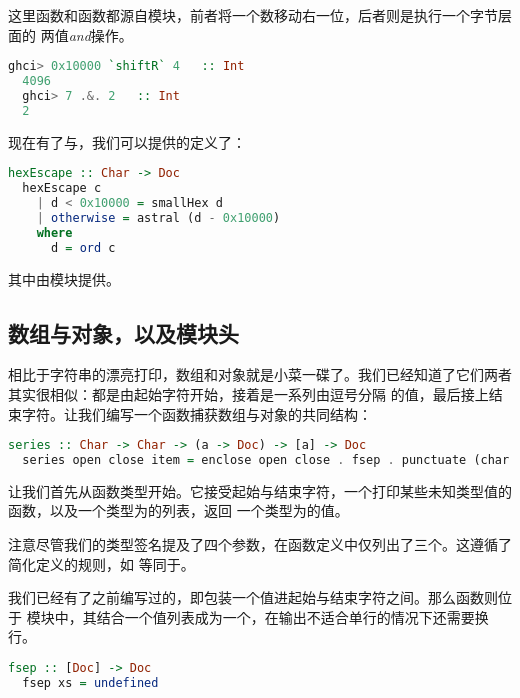 \documentclass[./main.tex]{subfiles}
\begin{document}
这里函数和函数都源自模块，前者将一个数移动右一位，后者则是执行一个字节层面的
两值\textit{and}操作。

\begin{lstlisting}[language=Haskell]
  ghci> 0x10000 `shiftR` 4   :: Int
  4096
  ghci> 7 .&. 2   :: Int
  2
\end{lstlisting}

现在有了与，我们可以提供的定义了：

\begin{lstlisting}[language=Haskell]
  hexEscape :: Char -> Doc
  hexEscape c
    | d < 0x10000 = smallHex d
    | otherwise = astral (d - 0x10000)
    where
      d = ord c
\end{lstlisting}

其中由模块提供。

\subsection*{数组与对象，以及模块头}

相比于字符串的漂亮打印，数组和对象就是小菜一碟了。我们已经知道了它们两者其实很相似：都是由起始字符开始，接着是一系列由逗号分隔
的值，最后接上结束字符。让我们编写一个函数捕获数组与对象的共同结构：

\begin{lstlisting}[language=Haskell]
  series :: Char -> Char -> (a -> Doc) -> [a] -> Doc
  series open close item = enclose open close . fsep . punctuate (char ',') . map item
\end{lstlisting}

让我们首先从函数类型开始。它接受起始与结束字符，一个打印某些未知类型值的函数，以及一个类型为的列表，返回
一个类型为的值。

注意尽管我们的类型签名提及了四个参数，在函数定义中仅列出了三个。这遵循了简化定义的规则，如
等同于。

我们已经有了之前编写过的，即包装一个值进起始与结束字符之间。那么函数则位于
模块中，其结合一个值列表成为一个，在输出不适合单行的情况下还需要换行。

\begin{lstlisting}[language=Haskell]
  fsep :: [Doc] -> Doc
  fsep xs = undefined
\end{lstlisting}
\end{document}
